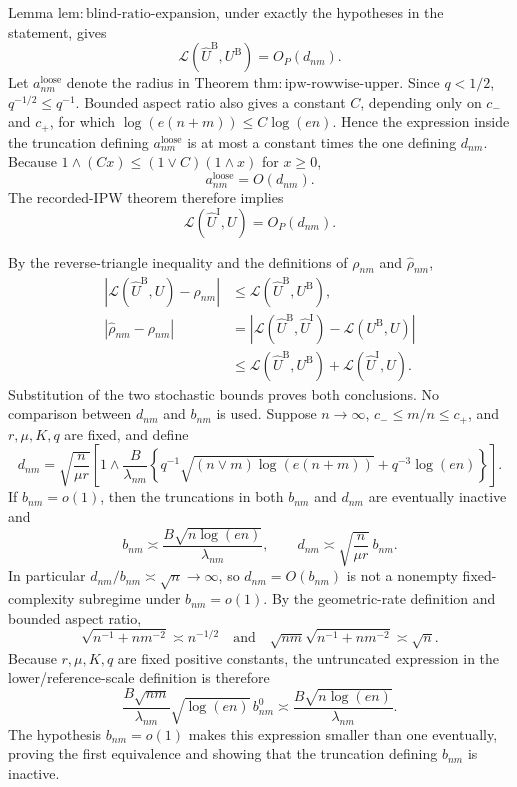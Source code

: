 Lemma \(\mathrm{lem:blind\mbox{-}ratio\mbox{-}expansion}\), under exactly the hypotheses in the statement, gives
\[
 \mathcal L(\widehat U^{\mathrm B},U^{\mathrm B})=O_P(d_{nm}).
\]
Let \(a^{\mathrm{loose}}_{nm}\) denote the radius in Theorem \(\mathrm{thm:ipw\mbox{-}rowwise\mbox{-}upper}\).  Since \(q<1/2\),
\(q^{-1/2}\le q^{-1}\).  Bounded aspect ratio also gives a constant \(C\), depending only on \(c_-\) and \(c_+\), for which
\(\log(e(n+m))\le C\log(en)\).  Hence the expression inside the truncation defining \(a^{\mathrm{loose}}_{nm}\) is at most a constant times the one defining \(d_{nm}\).  Because
\(1\wedge(Cx)\le(1\vee C)(1\wedge x)\) for \(x\ge0\),
\[
 a^{\mathrm{loose}}_{nm}=O(d_{nm}).
\]
The recorded-IPW theorem therefore implies
\[
 \mathcal L(\widehat U^{\mathrm I},U)=O_P(d_{nm}).
\]

By the reverse-triangle inequality and the definitions of \(\rho_{nm}\) and \(\widehat\rho_{nm}\),
\[
 \begin{aligned}
 \left|\mathcal L(\widehat U^{\mathrm B},U)-\rho_{nm}\right|
 &\le\mathcal L(\widehat U^{\mathrm B},U^{\mathrm B}),\\
 |\widehat\rho_{nm}-\rho_{nm}|
 &=\left|\mathcal L(\widehat U^{\mathrm B},\widehat U^{\mathrm I})
 -\mathcal L(U^{\mathrm B},U)\right|\\
 &\le\mathcal L(\widehat U^{\mathrm B},U^{\mathrm B})
 +\mathcal L(\widehat U^{\mathrm I},U).
 \end{aligned}
\]
Substitution of the two stochastic bounds proves both conclusions.  No comparison between \(d_{nm}\) and \(b_{nm}\) is used.
Suppose \(n\to\infty\), \(c_-\le m/n\le c_+\), and \(r,\mu,K,q\) are fixed, and define
\[
 d_{nm}=\sqrt{\frac n{\mu r}}\left[1\wedge
 \frac B{\lambda_{nm}}\left\{
 q^{-1}\sqrt{(n\vee m)\log(e(n+m))}+q^{-3}\log(en)
 \right\}\right].
\]
If \(b_{nm}=o(1)\), then the truncations in both \(b_{nm}\) and \(d_{nm}\) are eventually inactive and
\[
 b_{nm}\asymp\frac{B\sqrt{n\log(en)}}{\lambda_{nm}},
 \qquad
 d_{nm}\asymp\sqrt{\frac n{\mu r}}\,b_{nm}.
\]
In particular \(d_{nm}/b_{nm}\asymp\sqrt n\to\infty\), so \(d_{nm}=O(b_{nm})\) is not a nonempty fixed-complexity subregime under \(b_{nm}=o(1)\).
By the geometric-rate definition and bounded aspect ratio,
\[
 \sqrt{n^{-1}+nm^{-2}}\asymp n^{-1/2}
 \quad\text{and}\quad
 \sqrt{nm}\sqrt{n^{-1}+nm^{-2}}\asymp\sqrt n.
\]
Because \(r,\mu,K,q\) are fixed positive constants, the untruncated expression in the lower/reference-scale definition is therefore
\[
 \frac{B\sqrt{nm}}{\lambda_{nm}}\sqrt{\log(en)}\,b^0_{nm}
 \asymp\frac{B\sqrt{n\log(en)}}{\lambda_{nm}}.
\]
The hypothesis \(b_{nm}=o(1)\) makes this expression smaller than one eventually, proving the first equivalence and showing that the truncation defining \(b_{nm}\) is inactive.

